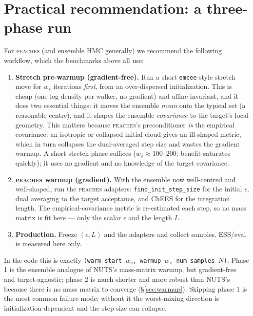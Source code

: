 \documentclass[11pt]{article}
\begin{document}
\section{Practical recommendation: a three-phase run}\label{sec:rec}

For \textsc{peaches} (and ensemble HMC generally) we recommend the following
workflow, which the benchmarks above all use:

\begin{enumerate}
\item[\textbf{1.}] \textbf{Stretch pre-warmup (gradient-free).} Run a short
\texttt{emcee}-style stretch move for $w_s$ iterations \emph{first}, from an
over-dispersed initialization. This is cheap (one log-density per walker, no
gradient) and affine-invariant, and it does two essential things: it moves the
ensemble \emph{mean} onto the typical set (a reasonable centre), and it shapes
the ensemble \emph{covariance} to the target's local geometry. This matters
because \textsc{peaches}'s preconditioner \emph{is} the empirical covariance: an
isotropic or collapsed initial cloud gives an ill-shaped metric, which in turn
collapses the dual-averaged step size and wastes the gradient warmup. A short
stretch phase suffices ($w_s\!\approx\!100$--$200$; benefit saturates quickly);
it uses no gradient and no knowledge of the target covariance.
\item[\textbf{2.}] \textbf{\textsc{peaches} warmup (gradient).} With the
ensemble now well-centred and well-shaped, run the \textsc{peaches} adapters:
\texttt{find\_init\_step\_size} for the initial $\epsilon$, dual averaging to the
target acceptance, and ChEES for the integration length. The
empirical-covariance metric is re-estimated each step, so no mass matrix is fit
here --- only the scalar $\epsilon$ and the length $L$.
\item[\textbf{3.}] \textbf{Production.} Freeze $(\epsilon,L)$ and the adapters
and collect samples. ESS/eval is measured here only.
\end{enumerate}

In the code this is exactly \texttt{(warm\_start $w_s$, warmup $w$,
num\_samples $N$)}. Phase 1 is the ensemble analogue of NUTS's mass-matrix
warmup, but gradient-free and target-agnostic; phase 2 is much shorter and more
robust than NUTS's because there is no mass matrix to converge
(\S\ref{sec:warmup}). Skipping phase 1 is the most common failure mode: without
it the worst-mixing direction is initialization-dependent and the step size can
collapse.
\end{document}
